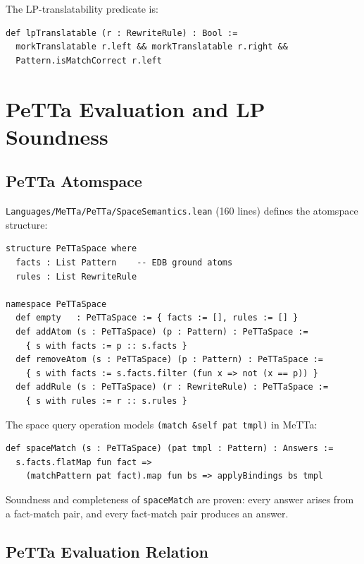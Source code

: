 \documentclass[]{article}
\newcommand{\code}[1]{\texttt{#1}}
\newcommand{\MeTTa}{\textup{MeTTa}}
\newcommand{\PeTTa}{\textup{PeTTa}}
\begin{document}
The LP-translatability predicate is:
\begin{lstlisting}[language=lean]
def lpTranslatable (r : RewriteRule) : Bool :=
  morkTranslatable r.left && morkTranslatable r.right &&
  Pattern.isMatchCorrect r.left
\end{lstlisting}

\section{\PeTTa{} Evaluation and LP Soundness}
\label{sec:petta}

\subsection{\PeTTa{} Atomspace}

\code{Languages/MeTTa/PeTTa/SpaceSemantics.lean} (160 lines) defines the atomspace structure:

\begin{lstlisting}[language=lean]
structure PeTTaSpace where
  facts : List Pattern    -- EDB ground atoms
  rules : List RewriteRule

namespace PeTTaSpace
  def empty   : PeTTaSpace := { facts := [], rules := [] }
  def addAtom (s : PeTTaSpace) (p : Pattern) : PeTTaSpace :=
    { s with facts := p :: s.facts }
  def removeAtom (s : PeTTaSpace) (p : Pattern) : PeTTaSpace :=
    { s with facts := s.facts.filter (fun x => not (x == p)) }
  def addRule (s : PeTTaSpace) (r : RewriteRule) : PeTTaSpace :=
    { s with rules := r :: s.rules }
\end{lstlisting}

The space query operation models \code{(match \&self pat tmpl)} in \MeTTa{}:

\begin{lstlisting}[language=lean]
def spaceMatch (s : PeTTaSpace) (pat tmpl : Pattern) : Answers :=
  s.facts.flatMap fun fact =>
    (matchPattern pat fact).map fun bs => applyBindings bs tmpl
\end{lstlisting}

Soundness and completeness of \code{spaceMatch} are proven:
every answer arises from a fact-match pair, and every fact-match pair
produces an answer.

\subsection{\PeTTa{} Evaluation Relation}
\end{document}
